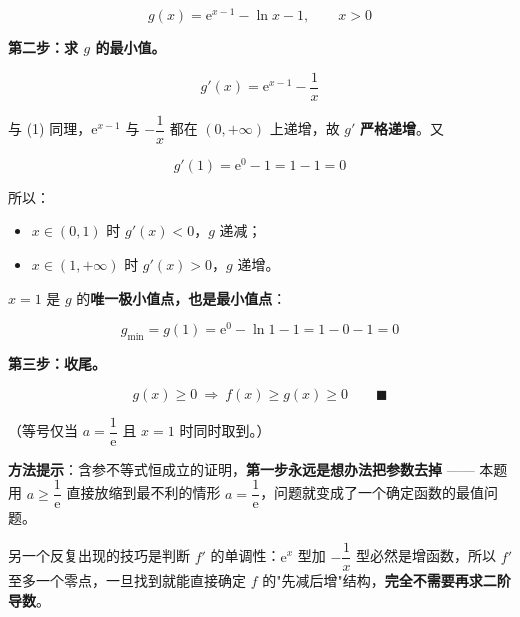 \begin{answer}
\nopagebreak[4]
\[g(x)=\mathrm e^{x-1}-\ln x-1,\qquad x>0\]

\textbf{第二步：求 $g$ 的最小值。}

\nopagebreak[4]
\[g'(x)=\mathrm e^{x-1}-\frac1x\]

与 (1) 同理，$\mathrm e^{x-1}$ 与 $-\dfrac1x$ 都在 $(0,+\infty)$ 上递增，故 $g'$ \textbf{严格递增}。又

\nopagebreak[4]
\[g'(1)=\mathrm e^{0}-1=1-1=0\]

所以：

\begin{itemize}
\item $x\in(0,1)$ 时 $g'(x)<0$，$g$ 递减；
\item $x\in(1,+\infty)$ 时 $g'(x)>0$，$g$ 递增。
\end{itemize}

$x=1$ 是 $g$ 的\textbf{唯一极小值点，也是最小值点}：

\nopagebreak[4]
\[g_{\min}=g(1)=\mathrm e^{0}-\ln1-1=1-0-1=0\]

\textbf{第三步：收尾。}

\nopagebreak[4]
\[g(x)\ge0\ \Longrightarrow\ f(x)\ge g(x)\ge0\qquad\blacksquare\]

（等号仅当 $a=\dfrac1{\mathrm e}$ 且 $x=1$ 时同时取到。）

\begin{gktip}
\textbf{方法提示}：含参不等式恒成立的证明，\textbf{第一步永远是想办法把参数去掉} —— 本题用 $a\ge\dfrac1{\mathrm e}$ 直接放缩到最不利的情形 $a=\dfrac1{\mathrm e}$，问题就变成了一个确定函数的最值问题。

另一个反复出现的技巧是判断 $f'$ 的单调性：$\mathrm e^{x}$ 型加 $-\dfrac1x$ 型必然是增函数，所以 $f'$ 至多一个零点，一旦找到就能直接确定 $f$ 的"先减后增"结构，\textbf{完全不需要再求二阶导数}。
\end{gktip}

\par\medskip

\Needspace{0.4\textheight}



\par\medskip

\end{answer}

